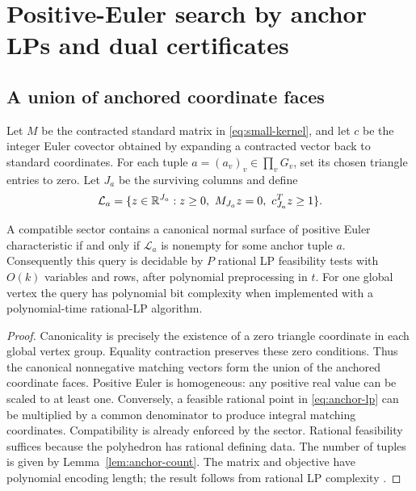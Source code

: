 \section{Positive-Euler search by anchor LPs and dual certificates}\label{sec:sector-lp}

\subsection{A union of anchored coordinate faces}

Let $M$ be the contracted standard matrix in \eqref{eq:small-kernel}, and let $c$ be the integer Euler covector obtained by expanding a contracted vector back to standard coordinates. For each tuple $a=(a_v)_v\in\prod_vG_v$, set its chosen triangle entries to zero. Let $J_a$ be the surviving columns and define
\begin{equation}\label{eq:anchor-lp}
 \mathcal L_a=\{z\in\R^{J_a}:z\ge0,\ M_{J_a}z=0,\ c_{J_a}^{T}z\ge1\}.
\end{equation}

\begin{theorem}\label{thm:anchor}
A compatible sector contains a canonical normal surface of positive Euler characteristic if and only if $\mathcal L_a$ is nonempty for some anchor tuple $a$. Consequently this query is decidable by $P$ rational LP feasibility tests with $O(k)$ variables and rows, after polynomial preprocessing in $t$. For one global vertex the query has polynomial bit complexity when implemented with a polynomial-time rational-LP algorithm.
\end{theorem}
\begin{proof}
Canonicality is precisely the existence of a zero triangle coordinate in each global vertex group. Equality contraction preserves these zero conditions. Thus the canonical nonnegative matching vectors form the union of the anchored coordinate faces. Positive Euler is homogeneous: any positive real value can be scaled to at least one. Conversely, a feasible rational point in \eqref{eq:anchor-lp} can be multiplied by a common denominator to produce integral matching coordinates. Compatibility is already enforced by the sector. Rational feasibility suffices because the polyhedron has rational defining data. The number of tuples is given by Lemma~\ref{lem:anchor-count}. The matrix and objective have polynomial encoding length; the result follows from rational LP complexity \cite{Khachiyan}.
\end{proof}

